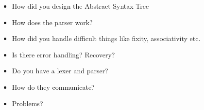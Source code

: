 \begin{todoenv}
  \begin{itemize}
    \item How did you design the Abstract Syntax Tree
    \item How does the parser work?
    \item How did you handle difficult things like fixity, associativity etc.
    \item Is there error handling? Recovery?
    \item Do you have a lexer and parser?
    \item How do they communicate?
    \item Problems?
  \end{itemize}
\end{todoenv}
